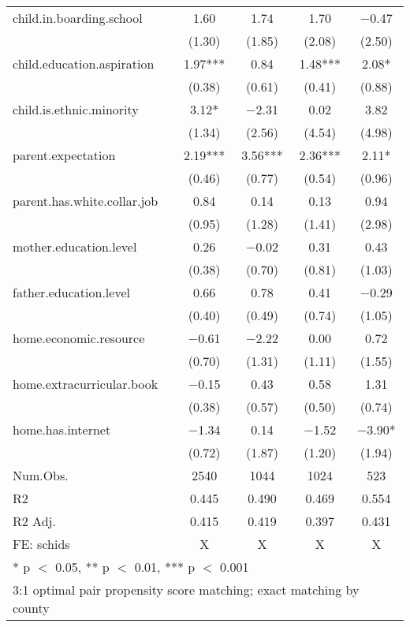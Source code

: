 \documentclass[
  man,floatsintext]{apa7}
\begin{document}
\begin{table}
\begin{tabular}[t]{lcccc}
child.in.boarding.school & \num{1.60} & \num{1.74} & \num{1.70} & \num{-0.47}\\
 & (\num{1.30}) & (\num{1.85}) & (\num{2.08}) & (\num{2.50})\\
child.education.aspiration & \num{1.97}*** & \num{0.84} & \num{1.48}*** & \num{2.08}*\\
 & (\num{0.38}) & (\num{0.61}) & (\num{0.41}) & (\num{0.88})\\
child.is.ethnic.minority & \num{3.12}* & \num{-2.31} & \num{0.02} & \num{3.82}\\
 & (\num{1.34}) & (\num{2.56}) & (\num{4.54}) & (\num{4.98})\\
parent.expectation & \num{2.19}*** & \num{3.56}*** & \num{2.36}*** & \num{2.11}*\\
 & (\num{0.46}) & (\num{0.77}) & (\num{0.54}) & (\num{0.96})\\
parent.has.white.collar.job & \num{0.84} & \num{0.14} & \num{0.13} & \num{0.94}\\
 & (\num{0.95}) & (\num{1.28}) & (\num{1.41}) & (\num{2.98})\\
mother.education.level & \num{0.26} & \num{-0.02} & \num{0.31} & \num{0.43}\\
 & (\num{0.38}) & (\num{0.70}) & (\num{0.81}) & (\num{1.03})\\
father.education.level & \num{0.66} & \num{0.78} & \num{0.41} & \num{-0.29}\\
 & (\num{0.40}) & (\num{0.49}) & (\num{0.74}) & (\num{1.05})\\
home.economic.resource & \num{-0.61} & \num{-2.22} & \num{0.00} & \num{0.72}\\
 & (\num{0.70}) & (\num{1.31}) & (\num{1.11}) & (\num{1.55})\\
home.extracurricular.book & \num{-0.15} & \num{0.43} & \num{0.58} & \num{1.31}\\
 & (\num{0.38}) & (\num{0.57}) & (\num{0.50}) & (\num{0.74})\\
home.has.internet & \num{-1.34} & \num{0.14} & \num{-1.52} & \num{-3.90}*\\
 & (\num{0.72}) & (\num{1.87}) & (\num{1.20}) & (\num{1.94})\\
\midrule
Num.Obs. & \num{2540} & \num{1044} & \num{1024} & \num{523}\\
R2 & \num{0.445} & \num{0.490} & \num{0.469} & \num{0.554}\\
R2 Adj. & \num{0.415} & \num{0.419} & \num{0.397} & \num{0.431}\\
FE: schids & X & X & X & X\\
\bottomrule
\multicolumn{5}{l}{\rule{0pt}{1em}* p $<$ 0.05, ** p $<$ 0.01, *** p $<$ 0.001}\\
\multicolumn{5}{l}{\rule{0pt}{1em}3:1 optimal pair propensity score matching; exact matching by county}\\
\end{tabular}
\end{table}
\end{document}
